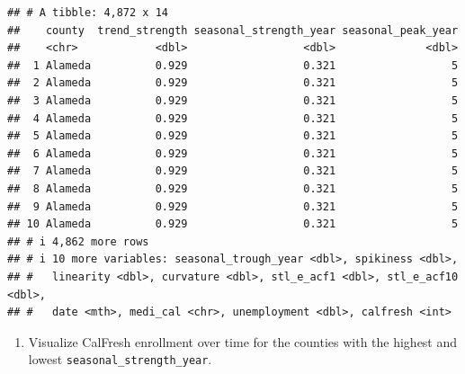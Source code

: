 \documentclass[
]{article}
\providecommand{\tightlist}{%
  \setlength{\itemsep}{0pt}\setlength{\parskip}{0pt}}
\begin{document}
\begin{verbatim}
## # A tibble: 4,872 x 14
##    county  trend_strength seasonal_strength_year seasonal_peak_year
##    <chr>            <dbl>                  <dbl>              <dbl>
##  1 Alameda          0.929                  0.321                  5
##  2 Alameda          0.929                  0.321                  5
##  3 Alameda          0.929                  0.321                  5
##  4 Alameda          0.929                  0.321                  5
##  5 Alameda          0.929                  0.321                  5
##  6 Alameda          0.929                  0.321                  5
##  7 Alameda          0.929                  0.321                  5
##  8 Alameda          0.929                  0.321                  5
##  9 Alameda          0.929                  0.321                  5
## 10 Alameda          0.929                  0.321                  5
## # i 4,862 more rows
## # i 10 more variables: seasonal_trough_year <dbl>, spikiness <dbl>,
## #   linearity <dbl>, curvature <dbl>, stl_e_acf1 <dbl>, stl_e_acf10 <dbl>,
## #   date <mth>, medi_cal <chr>, unemployment <dbl>, calfresh <int>
\end{verbatim}

\begin{enumerate}
\def\labelenumi{\alph{enumi}.}
\setcounter{enumi}{1}
\tightlist
\item
  Visualize CalFresh enrollment over time for the counties with the
  highest and lowest \texttt{seasonal\_strength\_year}.
\end{enumerate}
\end{document}
